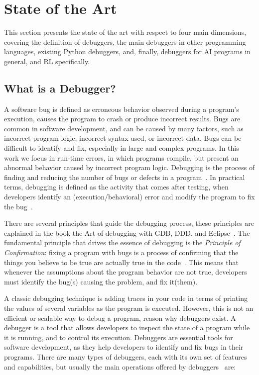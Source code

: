 
\section{State of the Art}
\label{sec:state_of_the_art}

This section presents the state of the art with respect to four main dimensions, covering the definition 
of debuggers, the main debuggers in other programming languages, existing Python debuggers, and, 
finally, debuggers for \ac{AI} programs in general, and \ac{RL} specifically.


\subsection{What is a Debugger?}
\label{sec:deb}

A software bug is defined as erroneous behavior observed during a program's execution, causes the 
program to crash or produce incorrect results. Bugs are common in software development, and can 
be caused by many factors, such as incorrect program logic, incorrect syntax used, or incorrect data. 
Bugs can be difficult to identify and fix, especially in large and complex programs. In this work we 
focus in run-time errors, in which programs compile, but present an abnormal behavior caused by 
incorrect program logic. Debugging is the process of finding and reducing the number of 
bugs or defects in a program~\cite{hindriks12}. In practical terms, debugging is defined as the 
activity that comes after testing, when developers identify an (execution/behavioral) error and modify
the program to fix the bug~\cite{mccauley08}. 

There are several principles that guide the debugging process, these principles are explained in the 
book the Art of debugging with \ac{GDB}, \ac{DDD}, and Eclipse~\cite{matloff08}. The fundamental 
principle that drives the essence of debugging is the \emph{Principle of Confirmation}: fixing a 
program with bugs is a process of confirming that the things you believe to be true are actually true in 
the code~\cite{matloff08}. This means that whenever the assumptions about the program behavior 
are not true, developers must identify the bug(s) causing the problem, and fix it(them).

A classic debugging technique is adding traces in your code in terms of printing the values of several 
variables as the program is executed. However, this is not an efficient or scalable way to debug a 
program, reason why debuggers exist. A debugger is a tool that allows developers to inspect the 
state of a program while it is running, and to control its execution. Debuggers are essential tools for 
software development, as they help developers to identify and fix bugs in their programs. There are 
many types of debuggers, each with its own set of features and capabilities, but usually the main 
operations offered by debuggers~\cite{matloff08} are:

